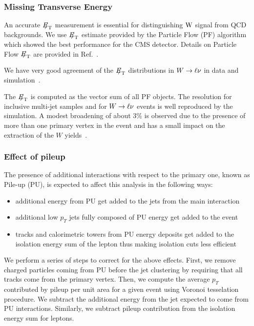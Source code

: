 \subsubsection{Missing Transverse Energy\label{sec:MET}}
An accurate ${E\!\!\!/}_{\mathrm{T}}$ measurement is essential for distinguishing
$\mathrm{W}$ signal from QCD backgrounds. We use ${E\!\!\!/}_{\mathrm{T}}$ estimate provided
by the Particle Flow (PF) algorithm which showed the best performance for the
CMS detector. Details on Particle Flow ${E\!\!\!/}_{\mathrm{T}}$ are provided in 
Ref.~\cite{PFMET}.
\par
We have very good agreement of the ${E\!\!\!/}_{\mathrm{T}}$
distributions in $W \rightarrow \ell \nu$ in data and simulation~\cite{metPAS}.
\par
The ${E\!\!\!/}_{\mathrm{T}}$ is computed as the vector sum of all PF objects.
The resolution for inclusive multi-jet samples and for
$W \rightarrow \ell \nu$ events is well reproduced by the simulation.  
A modest broadening of about $3\%$ is observed
due to the presence of more than one primary vertex in the event 
and has a small impact on the
extraction of the $W$ yields~\cite{WZCMS:2010}.
\subsubsection{Effect of pileup\label{sec:pileup}}
The presence of additional interactions with respect to the
primary one, known as Pile-up (PU), is expected to affect
this analysis in the following ways:
\begin{itemize}
\item additional energy from PU get added to the jets from the main 
interaction
\item additional low $p_{T}$ jets fully composed of PU energy get 
added to the event
\item tracks and calorimetric towers from PU energy deposits get 
added to the isolation energy sum of the lepton thus making isolation 
cuts less efficient 
\end{itemize}

We perform a series of steps to correct for the above effects.
First, we remove charged particles coming from PU before the 
jet clustering by requiring that all tracks come from the primary vertex. 
Then, we compute the average $p_{T}$ contributed by pileup per unit 
area for a given event using Voronoi tesselation procedure.
We subtract the additional energy from the jet expected to come 
from PU interactions.
Similarly, we subtract pileup contribution from the isolation 
energy sum for leptons.
